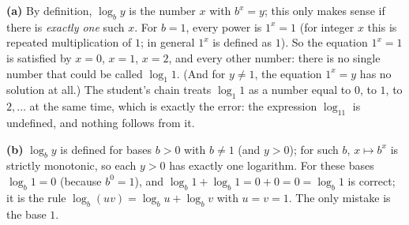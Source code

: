 \textbf{(a)} By definition, $\log_b y$ is the number $x$ with $b^x=y$; this only makes sense if there is \emph{exactly one} such $x$. For $b=1$, every power is $1^x=1$ (for integer $x$ this is repeated multiplication of $1$; in general $1^x$ is defined as $1$). So the equation $1^x=1$ is satisfied by $x=0$, $x=1$, $x=2$, and every other number: there is no single number that could be called $\log_1 1$. (And for $y\ne1$, the equation $1^x=y$ has no solution at all.) The student's chain treats $\log_1 1$ as a number equal to $0$, to $1$, to $2,\dots$ at the same time, which is exactly the error: the expression $\log_11$ is undefined, and nothing follows from it.

\textbf{(b)} $\log_b y$ is defined for bases $b>0$ with $b\ne1$ (and $y>0$); for such $b$, $x\mapsto b^x$ is strictly monotonic, so each $y>0$ has exactly one logarithm. For these bases $\log_b1=0$ (because $b^0=1$), and $\log_b1+\log_b1=0+0=0=\log_b1$ is correct; it is the rule $\log_b(uv)=\log_bu+\log_bv$ with $u=v=1$. The only mistake is the base $1$.
